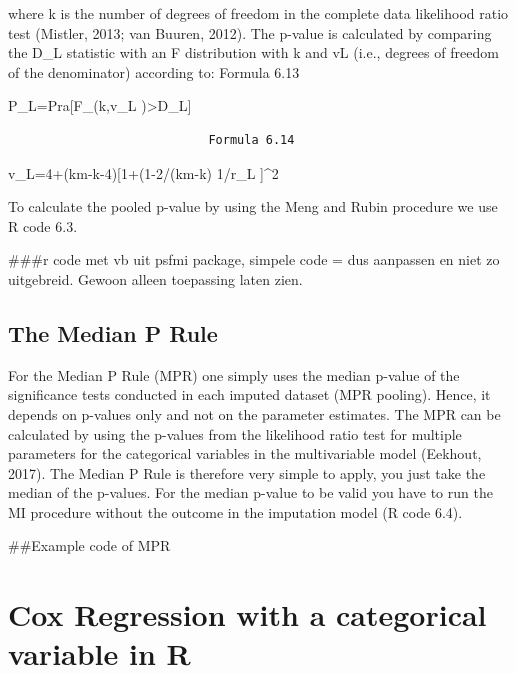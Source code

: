 \documentclass[]{book}
\newenvironment{Shaded}{\begin{snugshade}}{\end{snugshade}}
\newcommand{\NormalTok}[1]{#1}
\theoremstyle{definition}
\theoremstyle{definition}
\theoremstyle{definition}
\theoremstyle{remark}
\begin{document}
where k is the number of degrees of freedom in the complete data
likelihood ratio test (Mistler, 2013; van Buuren, 2012). The p-value is
calculated by comparing the D\_L statistic with an F distribution with k
and vL (i.e., degrees of freedom of the denominator) according to:
Formula 6.13

P\_L=Pra{[}F\_(k,v\_L )\textgreater{}D\_L{]}

\begin{verbatim}
                            Formula 6.14
\end{verbatim}

v\_L=4+(km-k-4){[}1+(1-2/(km-k) 1/r\_L {]}\^{}2

To calculate the pooled p-value by using the Meng and Rubin procedure we
use R code 6.3.

\begin{Shaded}
\begin{Highlighting}[]
\NormalTok{###r code met vb uit psfmi package, simpele code = dus aanpassen en niet zo uitgebreid. Gewoon alleen toepassing laten zien. }
\end{Highlighting}
\end{Shaded}

\subsection{The Median P Rule}\label{the-median-p-rule}

For the Median P Rule (MPR) one simply uses the median p-value of the
significance tests conducted in each imputed dataset (MPR pooling).
Hence, it depends on p-values only and not on the parameter estimates.
The MPR can be calculated by using the p-values from the likelihood
ratio test for multiple parameters for the categorical variables in the
multivariable model (Eekhout, 2017). The Median P Rule is therefore very
simple to apply, you just take the median of the p-values. For the
median p-value to be valid you have to run the MI procedure without the
outcome in the imputation model (R code 6.4).

\begin{Shaded}
\begin{Highlighting}[]
\NormalTok{##Example code of MPR}
\end{Highlighting}
\end{Shaded}

\section{Cox Regression with a categorical variable in
R}\label{cox-regression-with-a-categorical-variable-in-r}
\end{document}
